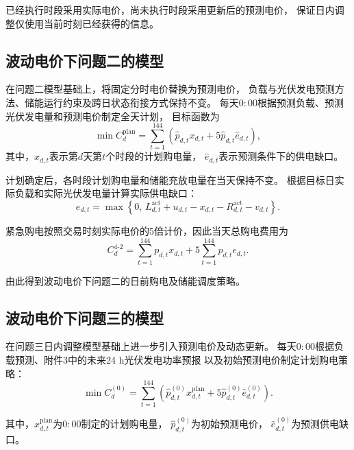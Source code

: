 已经执行时段采用实际电价，尚未执行时段采用更新后的预测电价，
保证日内调整仅使用当前时刻已经获得的信息。


\subsection{波动电价下问题二的模型}

在问题二模型基础上，将固定分时电价替换为预测电价，
负载与光伏发电预测方法、储能运行约束及跨日状态衔接方式保持不变。
每天$0{:}00$根据预测负载、预测光伏发电量和预测电价制定全天计划，
目标函数为
\begin{equation}
\min C_d^{\mathrm{plan}}
=
\sum_{t=1}^{144}
\left(
\widehat{p}_{d,t}x_{d,t}
+
5\widehat{p}_{d,t}\widehat{e}_{d,t}
\right),
\label{eq:p4_2_plan_cost}
\end{equation}
其中，$x_{d,t}$表示第$d$天第$t$个时段的计划购电量，
$\widehat{e}_{d,t}$表示预测条件下的供电缺口。

计划确定后，各时段计划购电量和储能充放电量在当天保持不变。
根据目标日实际负载和实际光伏发电量计算实际供电缺口：
\begin{equation}
e_{d,t}
=
\max
\left\{
0,\,
L_{d,t}^{\mathrm{act}}
+u_{d,t}
-x_{d,t}
-R_{d,t}^{\mathrm{act}}
-v_{d,t}
\right\}.
\label{eq:p4_2_emergency}
\end{equation}

紧急购电按照交易时刻实际电价的5倍计价，因此当天总购电费用为
\begin{equation}
C_d^{4\text{-}2}
=
\sum_{t=1}^{144}p_{d,t}x_{d,t}
+
5\sum_{t=1}^{144}p_{d,t}e_{d,t}.
\label{eq:p4_2_actual_cost}
\end{equation}

由此得到波动电价下问题二的日前购电及储能调度策略。


\subsection{波动电价下问题三的模型}

在问题三日内调整模型基础上进一步引入预测电价及动态更新。
每天$0{:}00$根据负载预测、附件3中的未来24 h光伏发电功率预报
以及初始预测电价制定计划购电策略：
\begin{equation}
\min C_d^{(0)}
=
\sum_{t=1}^{144}
\left(
\widehat{p}^{(0)}_{d,t}x^{\mathrm{plan}}_{d,t}
+
5\widehat{p}^{(0)}_{d,t}\widehat{e}^{(0)}_{d,t}
\right).
\label{eq:p4_3_plan}
\end{equation}

其中，$x^{\mathrm{plan}}_{d,t}$为$0{:}00$制定的计划购电量，
$\widehat{p}^{(0)}_{d,t}$为初始预测电价，
$\widehat{e}^{(0)}_{d,t}$为预测供电缺口。

